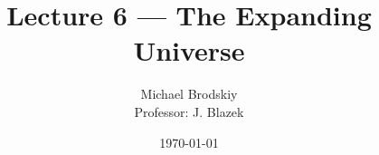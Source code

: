 


\title{Lecture 6 — The Expanding Universe}
\date{\today}
\author{Michael Brodskiy\\ \small Professor: J. Blazek}



\maketitle

